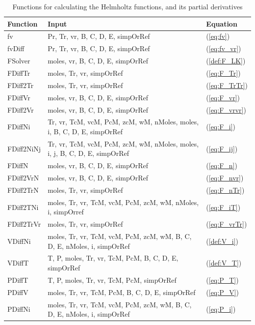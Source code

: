 \documentclass[internal,english]{sintefmemo2012}
\numberwithin{equation}{section}
\newcommand*{\reff}[1]{(\ref{#1})}
\begin{document}
\begin{table}[t]
\begin{center}
\caption{Functions for calculating the Helmholtz functions, and its partial derivatives}
\label{tab:functionsF}
\begin{tabular}{l p{10cm} l}
\hline%
Function 	& Input   & Equation \\
\hline
fv			& Pr, Tr, vr, B, C, D, E, simpOrRef & \reff{eq:fv} \\
fvDiff		& Pr, Tr, vr, B, C, D, E, simpOrRef & \reff{eq:fv_vr} \\
FSolver		& moles, vr, B, C, D, E, simpOrRef	& \reff{def:F_LK} \\
FDiffTr		& moles, Tr, vr, simpOrRef	& \reff{eq:F_Tr} \\
FDiff2Tr 	& moles, Tr, vr, simpOrRef	& \reff{eq:F_TrTr} \\
FDiffVr		& moles, vr, B, C, D, E, simpOrRef & \reff{eq:F_vr} \\
FDiff2Vr	& moles, vr, B, C, D, E, simpOrRef	& \reff{eq:F_vrvr} \\
FDiffNi		& Tr, vr, TcM, vcM, PcM, zcM, wM, nMoles, moles, i, B, C, D, E, simpOrRef & \reff{eq:F_i} \\
FDiff2NiNj	& Tr, vr, TcM, vcM, PcM, zcM, wM, nMoles, moles, i, j, B, C, D, E, simpOrRef & \reff{eq:F_ij} \\
FDiffN		& moles, vr, B, C, D, E, simpOrRef	& \reff{eq:F_n} \\
FDiff2VrN	& moles, vr, B, C, D, E, simpOrRef	& \reff{eq:F_nvr} \\
FDiff2TrN	& moles, Tr, vr, simpOrRef			& (\ref{eq:F_nTr}) \\

FDiff2TNi	& moles, Tr, vr, TcM, vcM, PcM, zcM, wM, nMoles, i, simpOrref	& \reff{eq:F_iT} \\
FDiff2TrVr	& moles, Tr, vr, simpOrRef	& \reff{eq:F_vrTr} \\
VDiffNi		& moles, Tr, vr, TcM, vcM, PcM, zcM, wM, B, C, D, E, nMoles, i, simpOrRef	& \reff{def:V_i} \\
VDiffT		& T, P, moles, Tr, vr, TcM, PcM, B, C, D, E, simpOrRef	& \reff{def:V_T} \\
PDiffT		& T, P, moles, Tr, vr, TcM, PcM, simpOrRef	& \reff{eq:P_T} \\
PDiffV		& moles, Tr, vr, TcM, PcM, B, C, D, E, simpOrRef	& \reff{eq:P_V} \\
PDiffNi		& moles, Tr, vr, TcM, vcM, PcM, zcM, wM, B, C, D, E, nMoles, i, simpOrRef	& \reff{eq:P_i} \\
\hline
\end{tabular}
\end{center}
\end{table}
\end{document}
